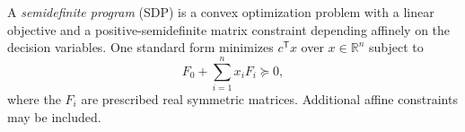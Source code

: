 
A \emph{semidefinite program} (SDP) is a convex optimization problem with a linear objective and a positive-semidefinite matrix constraint depending affinely on the decision variables. One standard form minimizes $c^{\mathsf T}x$ over $x\in\mathbb R^n$ subject to
\[
F_0+\sum_{i=1}^n x_iF_i\succeq0,
\]
where the $F_i$ are prescribed real symmetric matrices. Additional affine constraints may be included.
